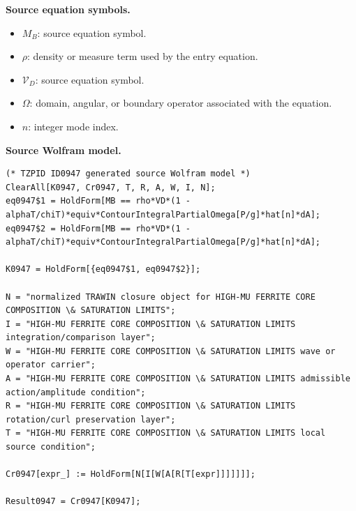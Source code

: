 \begin{minipage}[t]{0.49\linewidth}
\begingroup
\small
\raggedright
\textbf{Source equation symbols.}\par
\begin{itemize}[leftmargin=1.35em,itemsep=1pt,topsep=1pt,parsep=0pt]
    \item $M_B$: source equation symbol.
    \item $\rho$: density or measure term used by the entry equation.
    \item $\mathcal{V}_D$: source equation symbol.
    \item $\Omega$: domain, angular, or boundary operator associated with the equation.
    \item $n$: integer mode index.
\end{itemize}
\endgroup
\end{minipage}\hfill
\begin{minipage}[t]{0.47\linewidth}
\begingroup
\scriptsize
\raggedright
\textbf{Source Wolfram model.}\par
\begin{Verbatim}[fontsize=\tiny,breaklines=true,breakanywhere=true]
(* TZPID ID0947 generated source Wolfram model *)
ClearAll[K0947, Cr0947, T, R, A, W, I, N];
eq0947$1 = HoldForm[MB == rho*VD*(1 - alphaT/chiT)*equiv*ContourIntegralPartialOmega[P/g]*hat[n]*dA];
eq0947$2 = HoldForm[MB == rho*VD*(1 - alphaT/chiT)*equiv*ContourIntegralPartialOmega[P/g]*hat[n]*dA];

K0947 = HoldForm[{eq0947$1, eq0947$2}];

N = "normalized TRAWIN closure object for HIGH-MU FERRITE CORE COMPOSITION \& SATURATION LIMITS";
I = "HIGH-MU FERRITE CORE COMPOSITION \& SATURATION LIMITS integration/comparison layer";
W = "HIGH-MU FERRITE CORE COMPOSITION \& SATURATION LIMITS wave or operator carrier";
A = "HIGH-MU FERRITE CORE COMPOSITION \& SATURATION LIMITS admissible action/amplitude condition";
R = "HIGH-MU FERRITE CORE COMPOSITION \& SATURATION LIMITS rotation/curl preservation layer";
T = "HIGH-MU FERRITE CORE COMPOSITION \& SATURATION LIMITS local source condition";

Cr0947[expr_] := HoldForm[N[I[W[A[R[T[expr]]]]]]];

Result0947 = Cr0947[K0947];
\end{Verbatim}
\endgroup
\end{minipage}

